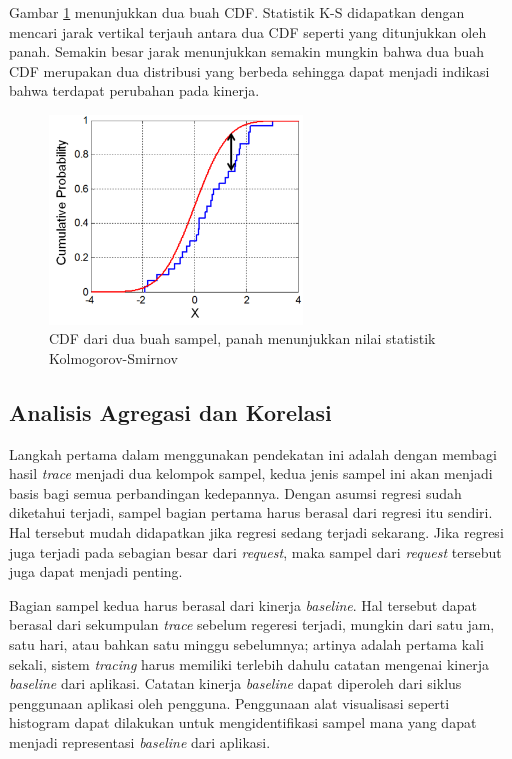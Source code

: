 Gambar \ref{ks-example} menunjukkan dua buah CDF. Statistik K-S didapatkan dengan mencari jarak vertikal terjauh antara dua CDF seperti yang ditunjukkan oleh panah. Semakin besar jarak menunjukkan semakin mungkin bahwa dua buah CDF merupakan dua distribusi yang berbeda sehingga dapat menjadi indikasi bahwa terdapat perubahan pada kinerja. 
\begin{figure}[htb]
	\centering
	\includegraphics[width=0.6\textwidth]{resources/ch2/ks.png}
	\caption{CDF dari dua buah sampel, panah menunjukkan nilai statistik Kolmogorov-Smirnov \citep{wiki:ks-test}}
	\label{ks-example}
\end{figure}

\vfill

\subsection{Analisis Agregasi dan Korelasi}
\label{approach-corr}

Langkah pertama dalam menggunakan pendekatan ini adalah dengan membagi hasil \textit{trace} menjadi dua kelompok sampel, kedua jenis sampel ini akan menjadi basis bagi semua perbandingan kedepannya. Dengan asumsi regresi sudah diketahui terjadi, sampel bagian pertama harus berasal dari regresi itu sendiri. Hal tersebut mudah didapatkan jika regresi sedang terjadi sekarang. Jika regresi juga terjadi pada sebagian besar dari \textit{request}, maka sampel dari \textit{request} tersebut juga dapat menjadi penting. 

Bagian sampel kedua harus berasal dari kinerja \textit{baseline}. Hal tersebut dapat berasal dari sekumpulan \textit{trace} sebelum regeresi terjadi, mungkin dari satu jam, satu hari, atau bahkan satu minggu sebelumnya; artinya adalah pertama kali sekali, sistem \textit{tracing} harus memiliki terlebih dahulu catatan mengenai kinerja \textit{baseline} dari aplikasi. Catatan kinerja \textit{baseline} dapat diperoleh dari siklus penggunaan aplikasi oleh pengguna. Penggunaan alat visualisasi seperti histogram dapat dilakukan untuk mengidentifikasi sampel mana yang dapat menjadi representasi \textit{baseline} dari aplikasi.

